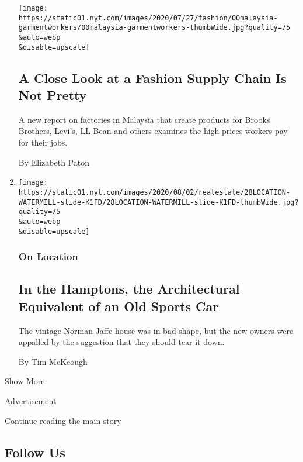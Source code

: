 \begin{enumerate}
  \texttt{[image: https://static01.nyt.com/images/2020/07/27/fashion/00malaysia-garmentworkers/00malaysia-garmentworkers-thumbWide.jpg?quality=75\\\&auto=webp\\\&disable=upscale]}

  \hypertarget{a-close-look-at-a-fashion-supply-chain-is-not-pretty-1}{%
  \subsection{A Close Look at a Fashion Supply Chain Is Not
  Pretty}\label{a-close-look-at-a-fashion-supply-chain-is-not-pretty-1}}

  A new report on factories in Malaysia that create products for Brooks
  Brothers, Levi's, LL Bean and others examines the high prices workers
  pay for their jobs.

  By Elizabeth Paton
\item
  \href{/2020/07/28/realestate/in-the-hamptons-the-architectural-equivalent-of-an-old-sports-car.html}{}

  \texttt{[image: https://static01.nyt.com/images/2020/08/02/realestate/28LOCATION-WATERMILL-slide-K1FD/28LOCATION-WATERMILL-slide-K1FD-thumbWide.jpg?quality=75\\\&auto=webp\\\&disable=upscale]}

  \hypertarget{on-location}{%
  \subsubsection{On Location}\label{on-location}}

  \hypertarget{in-the-hamptons-the-architectural-equivalent-of-an-old-sports-car}{%
  \subsection{In the Hamptons, the Architectural Equivalent of an Old
  Sports
  Car}\label{in-the-hamptons-the-architectural-equivalent-of-an-old-sports-car}}

  The vintage Norman Jaffe house was in bad shape, but the new owners
  were appalled by the suggestion that they should tear it down.

  By Tim McKeough
\end{enumerate}

Show More

Advertisement

\protect\hyperlink{after-mid7}{Continue reading the main story}

\hypertarget{follow-us}{%
\subsection{Follow Us}\label{follow-us}}

